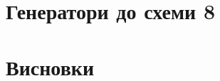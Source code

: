 \documentclass{article}
\begin{document}
\begin{normalsize}
	\section*{Генератори до схеми 8}
	\begin{figure}[H]
		\centering
		\hspace{5px}
	\end{figure}

	\section*{Висновки}
	
	    
\end{normalsize}
\end{document}
